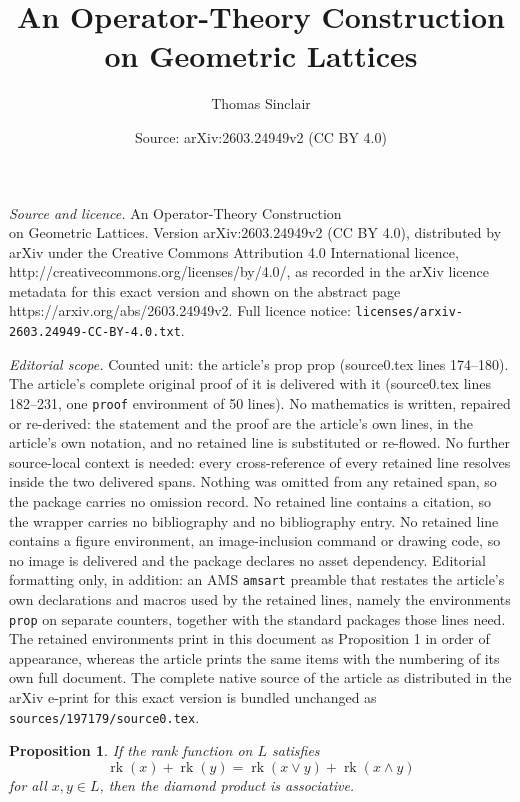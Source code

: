 \documentclass[10pt,a4paper]{amsart}
\title{An Operator-Theory Construction\\ on Geometric Lattices}
\author{Thomas Sinclair}
\date{Source: arXiv:2603.24949v2 (CC BY 4.0)}
\newtheorem{prop}{Proposition}
\DeclareMathOperator{\rk}{rk}
\begin{document}
\maketitle

\noindent\emph{Source and licence.} An Operator-Theory Construction\\ on Geometric Lattices. Version arXiv:2603.24949v2 (CC BY 4.0), distributed by arXiv under the Creative Commons Attribution 4.0 International licence, http://creativecommons.org/licenses/by/4.0/, as recorded in the arXiv licence metadata for this exact version and shown on the abstract page https://arxiv.org/abs/2603.24949v2. Full licence notice: \texttt{licenses/arxiv-2603.24949-CC-BY-4.0.txt}.\par\smallskip

\noindent\textit{Editorial scope.} Counted unit: the article's prop prop (source0.tex lines 174--180). The article's complete original proof of it is delivered with it (source0.tex lines 182--231, one \texttt{proof} environment of 50 lines). No mathematics is written, repaired or re-derived: the statement and the proof are the article's own lines, in the article's own notation, and no retained line is substituted or re-flowed.  No further source-local context is needed: every cross-reference of every retained line resolves inside the two delivered spans.  Nothing was omitted from any retained span, so the package carries no omission record.  No retained line contains a citation, so the wrapper carries no bibliography and no bibliography entry.  No retained line contains a figure environment, an image-inclusion command or drawing code, so no image is delivered and the package declares no asset dependency.  Editorial formatting only, in addition: an AMS \texttt{amsart} preamble that restates the article's own declarations and macros used by the retained lines, namely the environments \texttt{prop} on separate counters, together with the standard packages those lines need.  The retained environments print in this document as Proposition 1 in order of appearance, whereas the article prints the same items with the numbering of its own full document.  The complete native source of the article as distributed in the arXiv e-print for this exact version is bundled unchanged as \texttt{sources/197179/source0.tex}.
\begin{prop}
    If the rank function on $L$ satisfies
    \[
    \rk(x) + \rk(y) = \rk(x\vee y) + \rk(x\wedge y)
    \]
    for all $x,y\in L$, then the diamond product is associative.
\end{prop}
\end{document}
